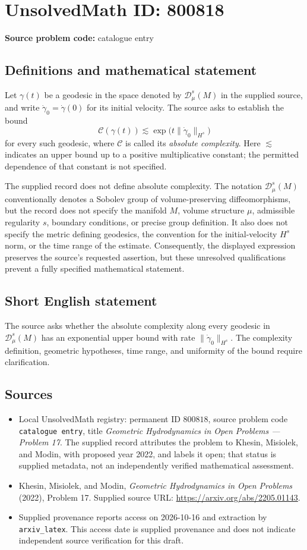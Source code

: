 \documentclass[11pt]{article}
\begin{document}
\section*{UnsolvedMath ID: 800818}
\textbf{Source problem code:} catalogue entry
\subsection{Definitions and mathematical statement}
Let \(\gamma(t)\) be a geodesic in the space denoted by \(\mathscr{D}_\mu^s(M)\) in the supplied source, and write \(\dot\gamma_0=\dot\gamma(0)\) for its initial velocity. The source asks to establish the bound
\[
\mathcal{C}(\gamma(t))\lesssim \exp\!\bigl(t\|\dot\gamma_0\|_{H^s}\bigr)
\]
for every such geodesic, where \(\mathcal{C}\) is called its \emph{absolute complexity}. Here \(\lesssim\) indicates an upper bound up to a positive multiplicative constant; the permitted dependence of that constant is not specified.

The supplied record does not define absolute complexity. The notation \(\mathscr{D}_\mu^s(M)\) conventionally denotes a Sobolev group of volume-preserving diffeomorphisms, but the record does not specify the manifold \(M\), volume structure \(\mu\), admissible regularity \(s\), boundary conditions, or precise group definition. It also does not specify the metric defining geodesics, the convention for the initial-velocity \(H^s\) norm, or the time range of the estimate. Consequently, the displayed expression preserves the source's requested assertion, but these unresolved qualifications prevent a fully specified mathematical statement.
\subsection{Short English statement}
The source asks whether the absolute complexity along every geodesic in \(\mathscr{D}_\mu^s(M)\) has an exponential upper bound with rate \(\|\dot\gamma_0\|_{H^s}\). The complexity definition, geometric hypotheses, time range, and uniformity of the bound require clarification.
\subsection{Sources}
\begin{itemize}
\item Local UnsolvedMath registry: permanent ID \(800818\), source problem code \texttt{catalogue entry}, title \emph{Geometric Hydrodynamics in Open Problems --- Problem 17}. The supplied record attributes the problem to Khesin, Misiolek, and Modin, with proposed year 2022, and labels it open; that status is supplied metadata, not an independently verified mathematical assessment.
\item Khesin, Misiolek, and Modin, \emph{Geometric Hydrodynamics in Open Problems} (2022), Problem 17. Supplied source URL: \url{https://arxiv.org/abs/2205.01143}.
\item Supplied provenance reports access on 2026-10-16 and extraction by \texttt{arxiv\_latex}. This access date is supplied provenance and does not indicate independent source verification for this draft.
\end{itemize}
\end{document}
